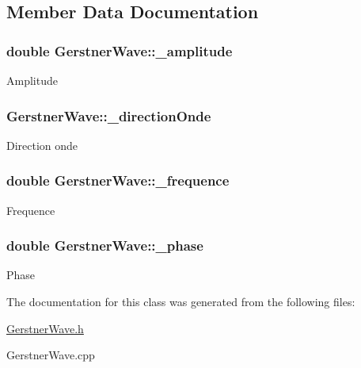 \subsection{Member Data Documentation}
\hypertarget{classGerstnerWave_ad6b1092e468e0126830317a310579f43}{
\subsubsection[{\-\_\-amplitude}]{\setlength{\rightskip}{0pt plus 5cm}double Gerstner\-Wave\-::\-\_\-amplitude\hspace{0.3cm}{\ttfamily [protected]}}}\label{classGerstnerWave_ad6b1092e468e0126830317a310579f43}
Amplitude \hypertarget{classGerstnerWave_a0a4926740fe7e170e5a9ca2b76815583}{
\subsubsection[{\-\_\-direction\-Onde}]{ Gerstner\-Wave\-::\-\_\-direction\-Onde\hspace{0.3cm}{\ttfamily [protected]}}}\label{classGerstnerWave_a0a4926740fe7e170e5a9ca2b76815583}
Direction onde \hypertarget{classGerstnerWave_ab49814056dd4b3258f04a206f7a6e920}{
\subsubsection[{\-\_\-frequence}]{\setlength{\rightskip}{0pt plus 5cm}double Gerstner\-Wave\-::\-\_\-frequence\hspace{0.3cm}{\ttfamily [protected]}}}\label{classGerstnerWave_ab49814056dd4b3258f04a206f7a6e920}
Frequence \hypertarget{classGerstnerWave_aee8b26bf0fd7274b7a8483f318d6c950}{
\subsubsection[{\-\_\-phase}]{\setlength{\rightskip}{0pt plus 5cm}double Gerstner\-Wave\-::\-\_\-phase\hspace{0.3cm}{\ttfamily [protected]}}}\label{classGerstnerWave_aee8b26bf0fd7274b7a8483f318d6c950}
Phase 

The documentation for this class was generated from the following files\-:\begin{DoxyCompactItemize}
\item 
\hyperlink{GerstnerWave_8h}{Gerstner\-Wave.\-h}\item 
Gerstner\-Wave.\-cpp\end{DoxyCompactItemize}
